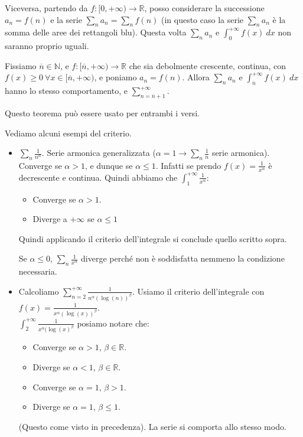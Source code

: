 Viceversa, partendo da  $f: [0,+\infty)\to \mathbb{R}$, posso considerare la successione $a_n = f(n)$ e la serie $\sum_n a_n = \sum_n f(n)$ (in questo caso la serie $\sum_n a_n$ è la somma delle aree dei rettangoli blu). Questa volta $\sum_n a_n$ e $\int_0^{+\infty}f(x) \:dx$ non saranno proprio uguali.\\
\begin{theorem}
Fissiamo $\overline{n} \in \mathbb{N}$, e $f: [\overline{n}, +\infty) \to \mathbb{R}$ che sia debolmente crescente, continua, con $f(x) \geq 0 \: \forall x \in [\overline{n}, +\infty)$, e poniamo $a_n = f(n)$. Allora $\sum_n a_n$ e $\int_{\overline{n}}^{+\infty}f(x)\:dx$ hanno lo stesso comportamento, e $\sum_{n=\overline{n}+1}^{+\infty}$.
\end{theorem}
Questo teorema può essere usato per entrambi i versi.
\begin{example}
Vediamo alcuni esempi del criterio.
\begin{itemize}
    \item $\sum_n \frac{1}{n^{\alpha}}$. Serie armonica generalizzata ($\alpha = 1 \longrightarrow \sum_n \frac{1}{n}$ serie armonica).\\
    Converge se $\alpha > 1$, e dunque se $\alpha \leq 1$. Infatti se prendo $f(x) = \frac{1}{x^{\alpha}}$ è decrescente e continua.
    Quindi abbiamo che $\int_1^{+\infty}\frac{1}{x^{\alpha}}$:
    \begin{itemize}
        \item Converge se $\alpha > 1$.
        \item Diverge a $+\infty$ se $\alpha \leq 1$
    \end{itemize}
    Quindi applicando il criterio dell'integrale si conclude quello scritto sopra.
    \begin{observation}
    Se $\alpha \leq 0$, $\sum_n\frac{1}{x^{\alpha}}$ diverge perché non è soddisfatta nemmeno la condizione necessaria.
    \end{observation}
    \item Calcoliamo $\sum_{n=2}^{+\infty}\frac{1}{n^{\alpha}(\log(n))^{\beta}}$. Usiamo il criterio dell'integrale con $f(x) = \frac{1}{x^{\alpha}(\log(x))^{\beta}}$.\\
    $\int_2^{+\infty}\frac{1}{x^{\alpha}(\log(x)^{\beta}}$ posiamo notare che:
    \begin{itemize}
        \item Converge se $\alpha > 1$, $\beta \in \mathbb{R}$.
        \item Diverge se $\alpha < 1$, $\beta \in \mathbb{R}$.
        \item Converge se $\alpha = 1$, $\beta > 1$.
        \item Diverge se $\alpha = 1$, $\beta \leq 1$.
    \end{itemize}
    (Questo come visto in precedenza). La serie si comporta allo stesso modo.
\end{itemize}
\end{example}

